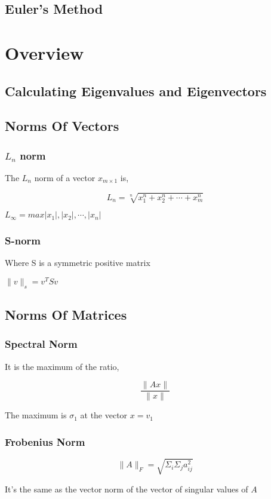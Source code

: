 \documentclass[11pt]{report}
\begin{document}
\chapter{Euler's Method}
\label{sec:org43d415d}
\part{Overview}
\label{sec:org7a4b9cb}
\chapter{Calculating Eigenvalues and Eigenvectors}
\label{sec:org105709d}
\chapter{Norms Of Vectors}
\label{sec:orgd0f0880}
\section{\(L_n\) norm}
\label{sec:org4c3fb4d}
The \(L_n\) norm of a vector \(x_{m \times 1}\) is,

$$L_n =\sqrt[n]{x_1^n + x_2^n + \cdots + x_m^n}$$

\(L_\infty = max{|x_1|, |x_2|, \cdots , |x_n|}\)
\section{S-norm}
\label{sec:org99de82f}
Where S is a symmetric positive matrix

\(\|v\|_s = v^T S v\)
\chapter{Norms Of Matrices}
\label{sec:orgc10a471}
\section{Spectral Norm}
\label{sec:orgb67607e}
It is the maximum of the ratio,

$$\frac{\|Ax\|}{\|x\|}$$

The maximum is \(\sigma_1\) at the vector \(x=v_1\)
\section{Frobenius Norm}
\label{sec:org5145e70}

$$\|A\|_F = \sqrt{\Sigma_i \Sigma_j a_{ij}^2}$$

It's the same as the vector norm of the vector of singular values of \(A\)
\end{document}
